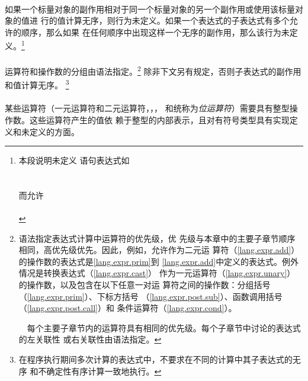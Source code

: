 {\paragraph{}
如果一个标量对象的副作用相对于同一个标量对象的另一个副作用或使用该标量对象的值进
行的值计算无序，则行为未定义。如果一个表达式的子表达式有多个允许的顺序，那么如果
在任何顺序中出现这样一个无序的副作用，那么该行为未定义。\footnote{本段说明未定义
语句表达式如                                                                  \\
\mbox{\hspace{4em}}                                          \\
\mbox{\hspace{4em}}                                           \\
而允许                                                                        \\
\mbox{\hspace{4em}}                                            \\
\mbox{\hspace{4em}}}

\paragraph{}
运算符和操作数的分组由语法指定。\footnote{语法指定表达式计算中运算符的优先级，优
先级与本章中的主要子章节顺序相同，高优先级优先。因此，例如，允许作为二元\tm{+}运
算符（\ref{lang.expr.add}）的操作数的表达式是\ref{lang.expr.prim}到
\ref{lang.expr.add}中定义的表达式。例外情况是转换表达式（\ref{lang.expr.cast}）
作为一元\tm{+}运算符（\ref{lang.expr.unary}）的操作数，以及包含在以下任意一对运
算符之间的操作数：分组括号\tm{()}（\ref{lang.expr.prim}）、下标方括号\tm{[]}
（\ref{lang.expr.post.sub}）、函数调用括号\tm{()}（\ref{lang.expr.post.call}）和
条件运算符（\ref{lang.expr.cond}）。\vspace{0.2cm}

\ \ 每个主要子章节内的运算符具有相同的优先级。每个子章节中讨论的表达式的左关联性
或右关联性由语法指定。} 除非下文另有规定，否则子表达式的副作用和值计算无序。
\footnote{在程序执行期间多次计算的表达式中，不要求在不同的计算中其子表达式的无序
和不确定性有序计算一致地执行。}

\paragraph{}
某些运算符（一元运算符\tm{\~}和二元运算符\tm{\tl{}\tl}，\tm{\tg{}\tg}，\tm{\&}，
\tm{\^}和\tm{|}统称为\textit{位运算符}）需要具有整型操作数。这些运算符产生的值依
赖于整型的内部表示，且对有符号类型具有实现定义和未定义的方面。

}
